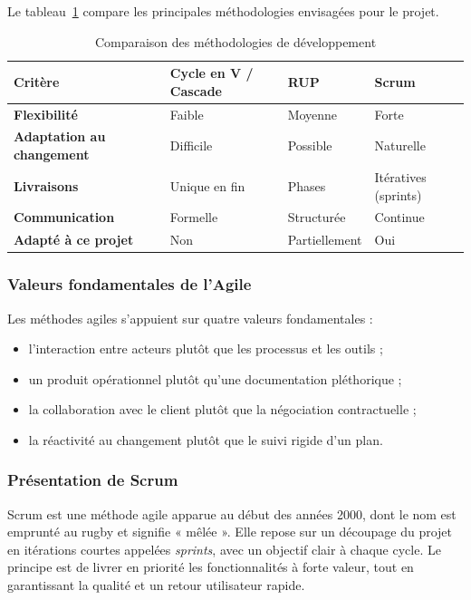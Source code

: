 Le tableau~\ref{tab:comparatif-methodologies} compare les principales méthodologies envisagées pour le projet.

\begin{table}[H]
\centering
\caption{Comparaison des méthodologies de développement}
\label{tab:comparatif-methodologies}
\renewcommand{\arraystretch}{1.4}
\begin{tabularx}{\textwidth}{>{\bfseries}l X X X}
\hline
\rowcolor{gray!15}
Critère & Cycle en V / Cascade & RUP & Scrum \\
\hline
Flexibilité              & Faible      & Moyenne       & Forte \\
Adaptation au changement & Difficile   & Possible      & Naturelle \\
Livraisons               & Unique en fin & Phases      & Itératives (sprints) \\
Communication            & Formelle    & Structurée    & Continue \\
Adapté à ce projet       & Non         & Partiellement & Oui \\
\hline
\end{tabularx}
\end{table}

\subsubsection{Valeurs fondamentales de l'Agile}
Les méthodes agiles s'appuient sur quatre valeurs fondamentales :
\begin{itemize}
  \item l'interaction entre acteurs plutôt que les processus et les outils ;
  \item un produit opérationnel plutôt qu'une documentation pléthorique ;
  \item la collaboration avec le client plutôt que la négociation contractuelle ;
  \item la réactivité au changement plutôt que le suivi rigide d'un plan.
\end{itemize}

\subsubsection{Présentation de Scrum}
Scrum est une méthode agile apparue au début des années 2000, dont le nom est emprunté au rugby et signifie « mêlée ». Elle repose sur un découpage du projet en itérations courtes appelées \textit{sprints}, avec un objectif clair à chaque cycle. Le principe est de livrer en priorité les fonctionnalités à forte valeur, tout en garantissant la qualité et un retour utilisateur rapide.

